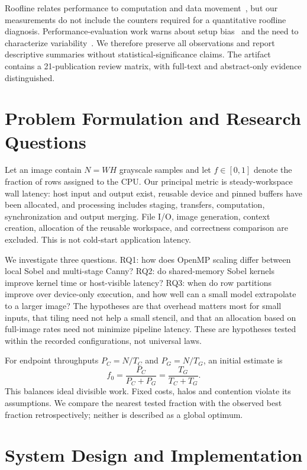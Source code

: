 \documentclass[conference]{IEEEtran}
\begin{document}
Roofline relates performance to computation and data movement~\cite{roofline}, but our measurements do not include the counters required for a quantitative roofline diagnosis. Performance-evaluation work warns about setup bias~\cite{measurementbias} and the need to characterize variability~\cite{georges}. We therefore preserve all observations and report descriptive summaries without statistical-significance claims. The artifact contains a 21-publication review matrix, with full-text and abstract-only evidence distinguished.

\section{Problem Formulation and Research Questions}
Let an image contain $N=WH$ grayscale samples and let $f\in[0,1]$ denote the fraction of rows assigned to the CPU. Our principal metric is steady-workspace wall latency: host input and output exist, reusable device and pinned buffers have been allocated, and processing includes staging, transfers, computation, synchronization and output merging. File I/O, image generation, context creation, allocation of the reusable workspace, and correctness comparison are excluded. This is not cold-start application latency.

We investigate three questions. RQ1: how does OpenMP scaling differ between local Sobel and multi-stage Canny? RQ2: do shared-memory Sobel kernels improve kernel time or host-visible latency? RQ3: when do row partitions improve over device-only execution, and how well can a small model extrapolate to a larger image? The hypotheses are that overhead matters most for small inputs, that tiling need not help a small stencil, and that an allocation based on full-image rates need not minimize pipeline latency. These are hypotheses tested within the recorded configurations, not universal laws.

For endpoint throughputs $P_C=N/T_C$ and $P_G=N/T_G$, an initial estimate is
\begin{equation}
f_0=\frac{P_C}{P_C+P_G}=\frac{T_G}{T_C+T_G}.
\end{equation}
This balances ideal divisible work. Fixed costs, halos and contention violate its assumptions. We compare the nearest tested fraction with the observed best fraction retrospectively; neither is described as a global optimum.

\section{System Design and Implementation}
\end{document}
